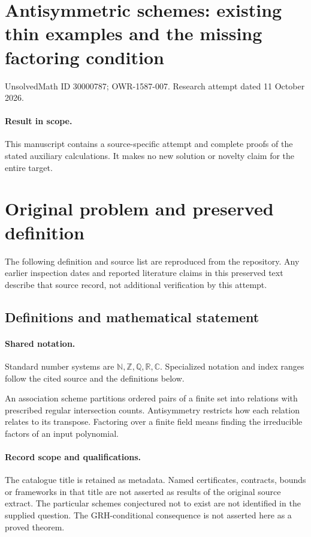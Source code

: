 \documentclass[11pt]{article}
\begin{document}
\section*{Antisymmetric schemes: existing thin examples and the missing factoring condition}
\noindent UnsolvedMath ID 30000787; OWR-1587-007. Research attempt dated 11 October 2026.
\paragraph{Result in scope.}This manuscript contains a source-specific attempt and complete proofs of the stated auxiliary calculations. It makes no new solution or novelty claim for the entire target.
\section{Original problem and preserved definition}
The following definition and source list are reproduced from the repository. Any earlier inspection dates and reported literature claims in this preserved text describe that source record, not additional verification by this attempt.
\subsection{Definitions and mathematical statement}

\paragraph{Shared notation.}Standard number systems are $\mathbb N,\mathbb Z,\mathbb Q,\mathbb R,\mathbb C$. Specialized notation and index ranges follow the cited source and the definitions below.


An association scheme partitions ordered pairs of a finite set into relations with prescribed regular intersection counts. Antisymmetry restricts how each relation relates to its transpose. Factoring over a finite field means finding the irreducible factors of an input polynomial.
\paragraph{Record scope and qualifications.}
The catalogue title is retained as metadata. Named certificates, contracts, bounds or frameworks in that title are not asserted as results of the original source extract.
The particular schemes conjectured not to exist are not identified in the supplied question. The GRH-conditional consequence is not asserted here as a proved theorem.
\end{document}
